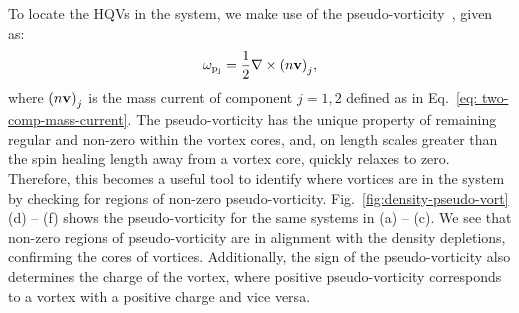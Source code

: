 To locate the HQVs in the system, we make use of the
pseudo-vorticity~\cite{Villois2016}, given as:
\begin{equation}
    \omega_\mathrm{p_j} = \frac{1}{2}\nabla \times {(n\vb{v})}_j,
\end{equation}
where \({(n\vb{v})}_j\) is the mass current of component \(j=1, 2\) defined as
in Eq.~\eqref{eq: two-comp-mass-current}.
The pseudo-vorticity has the unique property of remaining regular and non-zero
within the vortex cores, and, on length scales greater than the spin healing
length away from a vortex core, quickly relaxes to zero.
Therefore, this becomes a useful tool to identify where vortices are in the
system by checking for regions of non-zero pseudo-vorticity.
Fig.~\ref{fig:density-pseudo-vort} (d) {--} (f) shows the pseudo-vorticity for
the same systems in (a) {--} (c).
We see that non-zero regions of pseudo-vorticity are in alignment with the
density depletions, confirming the cores of vortices.
Additionally, the sign of the pseudo-vorticity also determines the charge of
the vortex, where positive pseudo-vorticity corresponds to a vortex with a
positive charge and vice versa.

